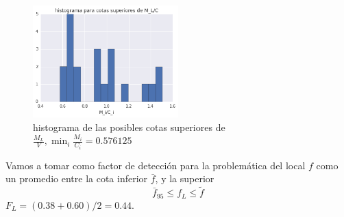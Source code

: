 \begin{figure}[H] 
  \centering
  \includegraphics[width=0.5\textwidth]{cota_sup_hist.png}
  \caption{
    histograma de las posibles cotas superiores de $\frac{M_L}{V},
    \min_i \frac{M_i}{C_i} = 0.576125$
  }
  \label{fig:CotaSup}
\end{figure}

Vamos a tomar como factor de detección para la problemática del local $f$
como un promedio entre la cota inferior $\bar{f}$,
y la superior
\[
\bar{f}_{95} \le f_L \le \widetilde{f}
\] 
$F_L = (0.38 + 0.60)/2 = 0.44$.


